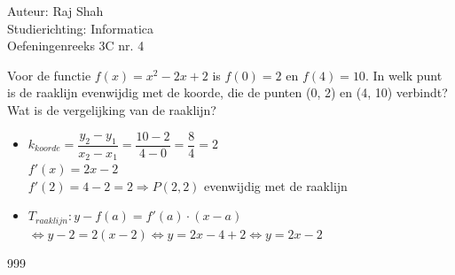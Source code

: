 \documentclass[a4paper]{article}
\begin{document}
  
\noindent \large Auteur: Raj Shah \\
\noindent \large Studierichting: Informatica\\
\noindent \large Oefeningenreeks 3C nr. 4\\

\medskip

\normalsize

Voor de functie $f(x) = x^2 - 2x + 2$ is $f(0) = 2 $ en $f(4) = 10 $. In welk punt is de raaklijn evenwijdig met de koorde, die de punten (0, 2) en (4, 10) verbindt? Wat is de vergelijking van de raaklijn?\\

\begin{itemize} 
	\item $k_{koorde} = \dfrac{y_2 - y_1}{x_2 - x_1} = \dfrac{10-2}{4-0} = \dfrac{8}{4} = 2$\\
	
	$f'(x) = 2x - 2$\\
	
	$f'(2) = 4 - 2 = 2 \Rightarrow P(2, 2)$ evenwijdig met de raaklijn\\
	
	\item $T_{raaklijn} : y - f(a) = f'(a) \cdot (x - a)$\\
	
	$\Leftrightarrow y - 2 = 2(x-2) \Leftrightarrow y = 2x -4 + 2 \Leftrightarrow y = 2x -2$

\end{itemize}

\begin{thebibliography}{999}
\end{thebibliography}
\end{document}
